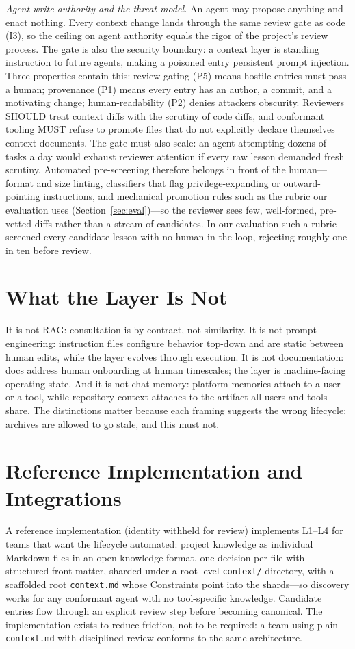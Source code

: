 \documentclass[sigconf,review,anonymous]{acmart}
\newcommand{\ctx}{\texttt{context.md}}
\begin{document}
\emph{Agent write authority and the threat model.} An agent may propose anything and enact nothing. Every context change lands through the same review gate as code (I3), so the ceiling on agent authority equals the rigor of the project's review process. The gate is also the security boundary: a context layer is standing instruction to future agents, making a poisoned entry persistent prompt injection. Three properties contain this: review-gating (P5) means hostile entries must pass a human; provenance (P1) means every entry has an author, a commit, and a motivating change; human-readability (P2) denies attackers obscurity. Reviewers SHOULD treat context diffs with the scrutiny of code diffs, and conformant tooling MUST refuse to promote files that do not explicitly declare themselves context documents. The gate must also scale: an agent attempting dozens of tasks a day would exhaust reviewer attention if every raw lesson demanded fresh scrutiny. Automated pre-screening therefore belongs in front of the human---format and size linting, classifiers that flag privilege-expanding or outward-pointing instructions, and mechanical promotion rules such as the rubric our evaluation uses (Section~\ref{sec:eval})---so the reviewer sees few, well-formed, pre-vetted diffs rather than a stream of candidates. In our evaluation such a rubric screened every candidate lesson with no human in the loop, rejecting roughly one in ten before review.

\section{What the Layer Is Not}
It is not RAG: consultation is by contract, not similarity. It is not prompt engineering: instruction files configure behavior top-down and are static between human edits, while the layer evolves through execution. It is not documentation: docs address human onboarding at human timescales; the layer is machine-facing operating state. And it is not chat memory: platform memories attach to a user or a tool, while repository context attaches to the artifact all users and tools share. The distinctions matter because each framing suggests the wrong lifecycle: archives are allowed to go stale, and this must not.

\section{Reference Implementation and Integrations}\label{sec:impl}
A reference implementation (identity withheld for review) implements L1--L4 for teams that want the lifecycle automated: project knowledge as individual Markdown files in an open knowledge format, one decision per file with structured front matter, sharded under a root-level \texttt{context/} directory, with a scaffolded root \ctx{} whose Constraints point into the shards---so discovery works for any conformant agent with no tool-specific knowledge. Candidate entries flow through an explicit review step before becoming canonical. The implementation exists to reduce friction, not to be required: a team using plain \ctx{} with disciplined review conforms to the same architecture.
\end{document}
